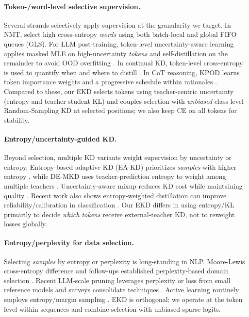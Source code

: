 \documentclass[11pt]{article}
\begin{document}
\paragraph{Token-/word-level selective supervision.} Several strands selectively apply supervision at the granularity we target. In NMT, \citet{wang2021selectivekd} select high cross-entropy \emph{words} using both batch-local and global FIFO queues (GLS). For LLM post-training, token-level uncertainty-aware learning applies masked MLE on high-uncertainty \emph{tokens} and self-distillation on the remainder to avoid OOD overfitting \citep{liu2025tokenlevel}. In continual KD, token-level cross-entropy is used to quantify when and where to distill \citep{zhang2023continualkd}. In CoT reasoning, KPOD learns token importance weights and a progressive schedule within rationales \citep{feng2024kpod}. Compared to these, our EKD selects tokens using teacher-centric uncertainty (entropy and teacher-student KL) and couples selection with \emph{unbiased} class-level Random-Sampling KD at selected positions; we also keep CE on all tokens for stability.

\paragraph{Entropy/uncertainty-guided KD.} Beyond selection, multiple KD variants weight supervision by uncertainty or entropy. Entropy-based adaptive KD (EA-KD) prioritizes \emph{samples} with higher entropy \citep{su2023eakd}, while DE-MKD uses teacher-prediction entropy to weight among multiple teachers \citep{cheng2024demkd}. Uncertainty-aware mixup reduces KD cost while maintaining quality \citep{xu2023unix}. Recent work also shows entropy-weighted distillation can improve reliability/calibration in classification \citep{guo2024entropykd}. Our EKD differs in using entropy/KL primarily to decide \emph{which tokens} receive external-teacher KD, not to reweight losses globally.


\paragraph{Entropy/perplexity for data selection.} Selecting \emph{samples} by entropy or perplexity is long-standing in NLP. Moore-Lewis cross-entropy difference and follow-ups established perplexity-based domain selection \citep{moore2010cediff,axelrod2015few,axelrod2017cynical}. Recent LLM-scale pruning leverages perplexity or loss from small reference models \citep{ankner2022perplexprune} and surveys consolidate techniques \citep{datasel2024survey}. Active learning routinely employs entropy/margin sampling \citep{zhang2022alsurvey}. EKD is orthogonal: we operate at the token level within sequences and combine selection with unbiased sparse logits.
\end{document}
